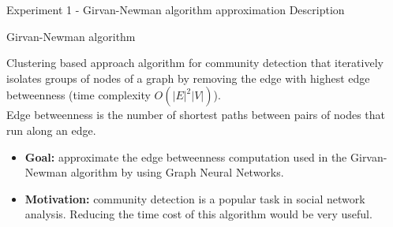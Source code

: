 \documentclass[xcolor=table]{beamer}
\begin{document}






\begin{frame}{Experiment 1 - Girvan-Newman algorithm approximation }{ Description}

\begin{block}{Girvan-Newman algorithm}{
        Clustering based approach algorithm for community detection that iteratively isolates groups of nodes of a graph by removing the edge with highest edge betweenness (time complexity $O(|E|^{2}|V|)$).
\\
Edge betweenness is the number of shortest paths between pairs of nodes that run along an edge.

}\end{block}



\begin{itemize}
    \item \textbf{Goal:} approximate the edge betweenness computation used in the Girvan-Newman algorithm by using Graph Neural Networks. 
    \item \textbf{Motivation:} community detection is a popular task in social network analysis. Reducing the time cost of this algorithm would be very useful.
\end{itemize}

\end{frame}






\end{document}

